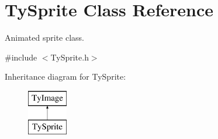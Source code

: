 \hypertarget{class_ty_sprite}{
\section{TySprite Class Reference}
\label{class_ty_sprite}
}


Animated sprite class.  




{\ttfamily \#include $<$TySprite.h$>$}

Inheritance diagram for TySprite:\begin{figure}[H]
\begin{center}
\leavevmode
\includegraphics[height=2.000000cm]{class_ty_sprite}
\end{center}
\end{figure}
